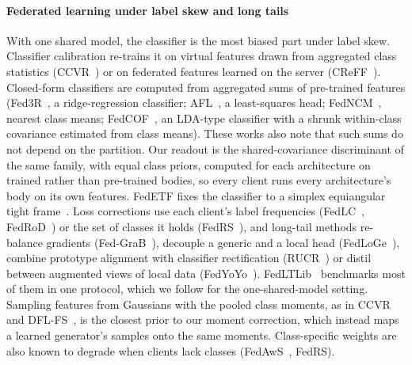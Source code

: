 \paragraph{Federated learning under label skew and long tails} With one shared model, the classifier is the most
biased part under label skew. Classifier calibration re-trains it on virtual features drawn from aggregated class
statistics (CCVR~\cite{luo2021ccvr}) or on federated features learned on the server (CReFF~\cite{shang2022creff}).
Closed-form classifiers are computed from aggregated sums of pre-trained features
(Fed3R~\cite{fani2024fed3r}, a ridge-regression classifier; AFL~\cite{he2025afl}, a least-squares head;
FedNCM~\cite{legate2023fedncm}, nearest class means; FedCOF~\cite{goswami2025fedcof}, an LDA-type classifier with a
shrunk within-class covariance estimated from class means). These works also note that such sums do not depend on the
partition. Our readout is the shared-covariance discriminant of the same family, with equal class priors, computed for
each architecture on trained rather than pre-trained bodies, so every client runs every architecture's body on its
own features. FedETF fixes the classifier to a simplex equiangular tight
frame~\cite{li2023fedetf}. Loss corrections use each client's label frequencies (FedLC~\cite{zhang2022fedlc},
FedRoD~\cite{chen2022fedrod}) or the set of classes it holds (FedRS~\cite{li2021fedrs}), and long-tail methods re-balance gradients
(Fed-GraB~\cite{xiao2023fedgrab}), decouple a generic and a local head (FedLoGe~\cite{xiao2024fedloge}), combine prototype
alignment with classifier rectification (RUCR~\cite{huang2024rucr}) or distil between augmented views of local data
(FedYoYo~\cite{yan2025fedyoyo}). FedLTLib~\cite{lin2026fedltlib} benchmarks most of them in one protocol, which we follow for
the one-shared-model setting. Sampling features from Gaussians with the pooled class moments, as in CCVR and
DFL-FS~\cite{chen2024dflfs}, is the closest prior to our moment correction, which instead maps a learned generator's
samples onto the same moments. Class-specific weights are also known to degrade when clients lack classes
(FedAwS~\cite{yu2020fedaws}, FedRS).

